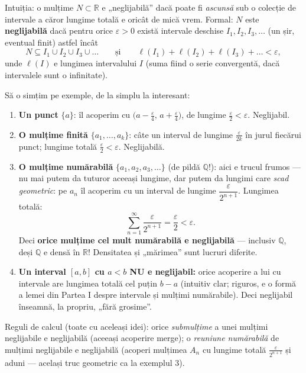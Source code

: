 \begin{definitie}
Intuiția: o mulțime $N\subset\mathbb{R}$ e „neglijabilă'' dacă poate fi \emph{ascunsă} sub o colecție de intervale a căror lungime totală e oricât de mică vrem. Formal: $N$ este \textbf{neglijabilă} dacă pentru orice $\varepsilon>0$ există intervale deschise $I_1,I_2,I_3,\dots$ (un șir, eventual finit) astfel încât
\[
N\subseteq I_1\cup I_2\cup I_3\cup\dots
\qquad\text{și}\qquad
\ell(I_1)+\ell(I_2)+\ell(I_3)+\dots<\varepsilon,
\]
unde $\ell(I)$ e lungimea intervalului $I$ (suma fiind o serie convergentă, dacă intervalele sunt o infinitate).

Să o simțim pe exemple, de la simplu la interesant:
\begin{enumerate}[leftmargin=*, itemsep=2pt]
\item \textbf{Un punct} $\{a\}$: îl acoperim cu $\big(a-\frac\varepsilon4,\,a+\frac\varepsilon4\big)$, de lungime $\frac\varepsilon2<\varepsilon$. Neglijabil.
\item \textbf{O mulțime finită} $\{a_1,\dots,a_k\}$: câte un interval de lungime $\frac{\varepsilon}{2k}$ în jurul fiecărui punct; lungime totală $\frac\varepsilon2<\varepsilon$. Neglijabilă.
\item \textbf{O mulțime numărabilă} $\{a_1,a_2,a_3,\dots\}$ (de pildă $\mathbb{Q}$!): aici e trucul frumos --- nu mai putem da tuturor aceeași lungime, dar putem da lungimi care \emph{scad geometric}: pe $a_n$ îl acoperim cu un interval de lungime $\dfrac{\varepsilon}{2^{n+1}}$. Lungimea totală:
\[
\sum_{n=1}^{\infty}\frac{\varepsilon}{2^{n+1}}=\frac{\varepsilon}{2}<\varepsilon.
\]
Deci \textbf{orice mulțime cel mult numărabilă e neglijabilă} --- inclusiv $\mathbb{Q}$, deși $\mathbb{Q}$ e densă în $\mathbb{R}$! Densitatea și „mărimea'' sunt lucruri diferite.
\item \textbf{Un interval $[a,b]$ cu $a<b$ NU e neglijabil:} orice acoperire a lui cu intervale are lungimea totală cel puțin $b-a$ (intuitiv clar; riguros, e o formă a lemei din Partea I despre intervale și mulțimi numărabile). Deci neglijabil înseamnă, la propriu, „fără grosime''.
\end{enumerate}
Reguli de calcul (toate cu aceleași idei): orice \emph{submulțime} a unei mulțimi neglijabile e neglijabilă (aceeași acoperire merge); o \emph{reuniune numărabilă} de mulțimi neglijabile e neglijabilă (acoperi mulțimea $A_n$ cu lungime totală $\frac{\varepsilon}{2^{n+1}}$ și aduni --- același truc geometric ca la exemplul 3).
\end{definitie}

